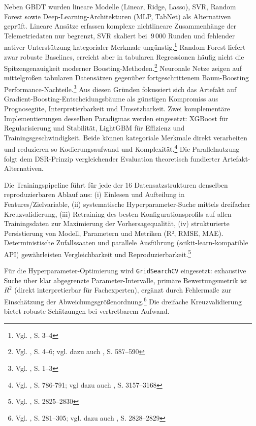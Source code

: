 Neben \ac{GBDT} wurden lineare Modelle (Linear, Ridge, Lasso), \ac{SVR}, Random Forest sowie Deep-Learning-Architekturen (MLP, TabNet) als Alternativen geprüft. Lineare Ansätze erfassen komplexe nichtlineare Zusammenhänge der Telemetriedaten nur begrenzt, \ac{SVR} skaliert bei \(~9\,000\) Runden und fehlender nativer Unterstützung kategorialer Merkmale ungünstig.\footnote{Vgl. \cite{Pasaribu2024}, S. 3–4} Random Forest liefert zwar robuste Baselines, erreicht aber in tabularen Regressionen häufig nicht die Spitzengenauigkeit moderner Boosting-Methoden.\footnote{Vgl. \cite{Geeks2024}, S. 4–6; vgl. dazu auch \cite{Hastie2009}, S. 587–590} Neuronale Netze zeigen auf mittelgroßen tabularen Datensätzen gegenüber fortgeschrittenem Baum-Boosting Performance-Nachteile.\footnote{Vgl. \cite{McElfresh2023}, S. 1–3} Aus diesen Gründen fokussiert sich das Artefakt auf Gradient-Boosting-Entscheidungsbäume als günstigen Kompromiss aus Prognosegüte, Interpretierbarkeit und Umsetzbarkeit.
Zwei komplementäre Implementierungen desselben Paradigmas werden eingesetzt: XGBoost für Regularisierung und Stabilität, LightGBM für Effizienz und Trainingsgeschwindigkeit. Beide können kategoriale Merkmale direkt verarbeiten und reduzieren so Kodierungsaufwand und Komplexität.\footnote{Vgl. \cite{Chen2016}, S. 786-791; vgl dazu auch \cite{Ke2017}, S. 3157–3168} Die Parallelnutzung folgt dem \ac{DSR}-Prinzip vergleichender Evaluation theoretisch fundierter Artefakt-Alternativen.

Die Trainingspipeline führt für jede der 16 Datensatzstrukturen denselben reproduzierbaren Ablauf aus: (i) Einlesen und Aufteilung in Features/Zielvariable, (ii) systematische Hyperparameter-Suche mittels dreifacher Kreuzvalidierung, (iii) Retraining des besten Konfigurationsprofils auf allen Trainingsdaten zur Maximierung der Vorhersagequalität, (iv) strukturierte Persistierung von Modell, Parametern und Metriken (R², RMSE, MAE). Deterministische Zufallssaaten und parallele Ausführung (scikit-learn-kompatible API) gewährleisten Vergleichbarkeit und Reproduzierbarkeit.\footnote{Vgl. \cite{Pedregosa2011}, S. 2825–2830}

Für die Hyperparameter-Optimierung wird \texttt{GridSearchCV} eingesetzt: exhaustive Suche über klar abgegrenzte Parameter-Intervalle, primäre Bewertungsmetrik ist $R^2$ (direkt interpretierbar für Fachexperten), ergänzt durch Fehlermaße zur Einschätzung der Abweichungsgrößenordnung.\footnote{Vgl. \cite{Bergstra2012}, S. 281–305; vgl. dazu auch \cite{Pedregosa2011}, S. 2828–2829} Die dreifache Kreuzvalidierung bietet robuste Schätzungen bei vertretbarem Aufwand.

